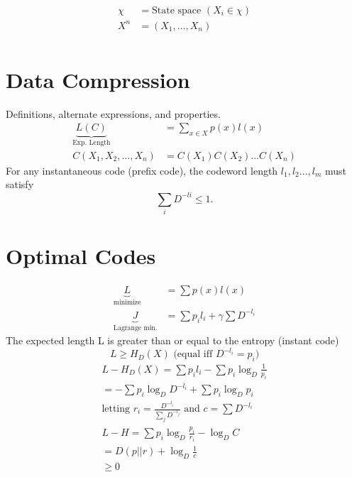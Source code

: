 \documentclass[10pt]{article}
\begin{document}
\begin{tiny}
\begin{multicols}{3}
\begin{align*}
\chi &= \text{State space } (X_i \in \chi) \\
X^n &=(X_1,\ldots,X_n) \\
\end{align*}


\section*{Data Compression}
Definitions, alternate expressions, and properties.
\begin{align}
    \underbrace{L(C)}_\text{Exp. Length}&= \sum_{x\in X} p(x)l(x) \label{defn: Exp. Length}\\
C(X_1,X_2,\ldots,X_n) &= C(X_1)C(X_2)\ldots C(X_n)
\end{align}
 \label{thm: kraft}
For any instantaneous code (prefix code), the codeword length $l_1,l_2 \ldots , l_m$ must satisfy
\begin{equation}
\sum_i D^{-li}  \leq 1.
\end{equation}
\section*{Optimal Codes}
\begin{align}
\underbrace{L}_\text{minimize}&= \sum p(x)l(x) \label{defn: minimize}\\
\underbrace{J}_\text{Lagrange min.}&= \sum {p_i}{l_i} + \gamma \sum D^{-l_i} \label{defn: lagrange}
\end{align}
 \label{thm: codewordentropy}
The expected length L is greater than or equal to the entropy (instant code)
\begin{equation}
L \geq H_D(X) \text{ (equal iff } D^{-l_i} = p_i \text{)}
\end{equation}
\begin{eqnarray}
L - H_D(X) = \sum {p_i}{l_i} - \sum {p_i} \log_D \frac {1}{p_i}\\
= - \sum {p_i} \log_D D^{-l_i} + \sum {p_i} \log_D {p_i} \\
\text{letting } {r_i} = \frac {D^{-l_i}}{\sum_j D^{-l_j}} \text{ and } c = \sum D^{-l_i} \\
L - H = \sum {p_i} \log_D \frac {p_i}{r_i} - \log_D C \\
= D(p||r) + \log_D \frac {1}{c} \\
\geq 0 
\end{eqnarray}


\end{multicols}
\end{tiny}
\end{document}
